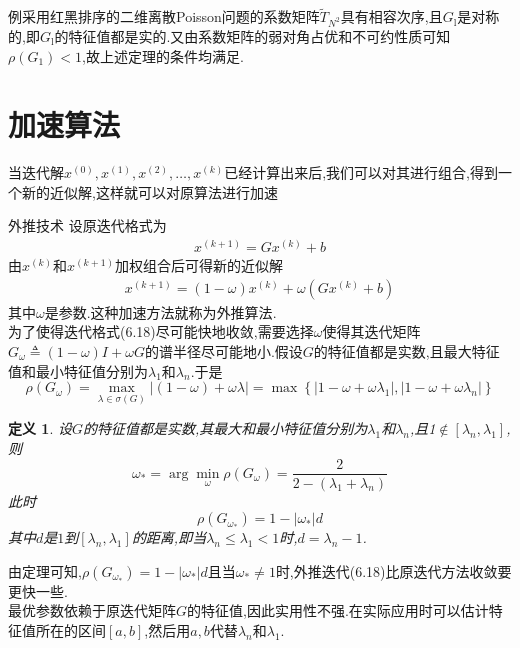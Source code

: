 \documentclass[notheorems,serif]{beamer}
\newcommand{\hei}[1]{{\HEI#1}}
\newtheorem{definition}{\hei{定义}}
\begin{document}
\begin{frame}
{\color{blue}例}\qquad 采用红黑排序的二维离散Poisson问题的系数矩阵$\tilde{T}_{N^{2}}$具有相容次序,且$G_{\mathrm{l}}$是对称的,即$G_{\mathrm{l}}$的特征值都是实的.又由系数矩阵的弱对角占优和不可约性质可知$\rho\left(G_{1}\right)<1$,故上述定理的条件均满足.
\end{frame}

\section{加速算法}
\begin{frame}
当迭代解$x^{(0)}, x^{(1)}, x^{(2)}, \ldots, x^{(k)}$已经计算出来后,我们可以对其进行组合,得到一个新的近似解,这样就可以对原算法进行加速
\end{frame}

\begin{frame}
{外推技术}
设原迭代格式为
\begin{align*}
x^{(k+1)}=G x^{(k)}+b
\tag{6.17}
\end{align*}
由$x^{(k)}$和$x^{(k+1)}$加权组合后可得新的近似解
\begin{align*}
x^{(k+1)}=(1-\omega) x^{(k)}+\omega\left(G x^{(k)}+b\right)
\tag{6.18}
\end{align*}
其中$\omega$是参数.这种加速方法就称为{\color{blue}外推算法}.\\
为了使得迭代格式(6.18)尽可能快地收敛,需要选择$\omega$使得其迭代矩阵$G_{\omega} \triangleq(1-\omega) I+\omega G$的谱半径尽可能地小.假设$G$的特征值都是实数,且最大特征值和最小特征值分别为$\lambda_{1}$和$\lambda_{n}$.于是
$$
\rho\left(G_{\omega}\right)=\max _{\lambda \in \sigma(G)}|(1-\omega)+\omega \lambda|=\max \left\{\left|1-\omega+\omega \lambda_{1}\right|,\left|1-\omega+\omega \lambda_{n}\right|\right\}
$$
\end{frame}

\begin{frame}
\begin{definition}
设$G$的特征值都是实数,其最大和最小特征值分别为$\lambda_{1}$和$\lambda_{n}$,且1$\notin\left[\lambda_{n}, \lambda_{1}\right]$,则
$$
\omega_{*}=\arg \min _{\omega} \rho\left(G_{\omega}\right)=\frac{2}{2-\left(\lambda_{1}+\lambda_{n}\right)}
$$
此时
$$
\rho\left(G_{\omega_{*}}\right)=1-\left|\omega_{*}\right| d
$$
其中$d$是$1$到$\left[\lambda_{n}, \lambda_{1}\right]$的距离,即当$\lambda_{n} \leq \lambda_{1}<1$时,$d=\lambda_{n}-1$.\\
\end{definition}

由定理可知,$\rho\left(G_{\omega_{*}}\right)=1-\left|\omega_{*}\right| d$且当$\omega_{*} \neq 1$时,外推迭代(6.18)比原迭代方法收敛要更快一些.\\
最优参数依赖于原迭代矩阵$G$的特征值,因此实用性不强.在实际应用时可以估计特征值所在的区间$[a, b]$,然后用$a,b$代替$\lambda_{n}$和$\lambda_{1}$.
\end{frame}
\end{document}
